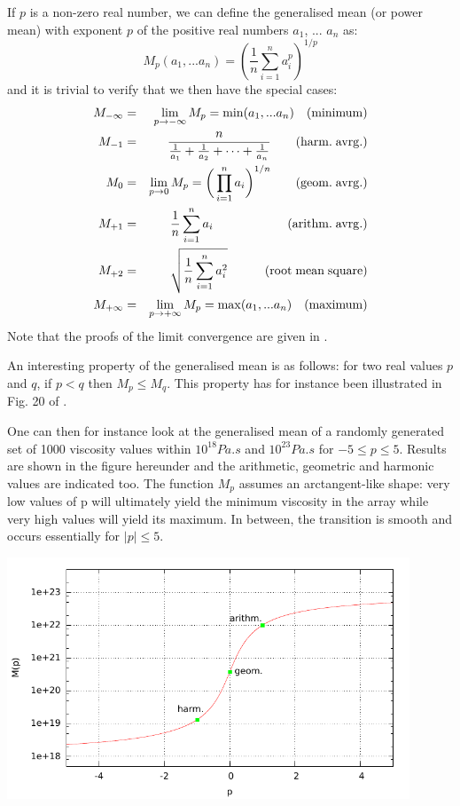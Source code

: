 If $p$ is a non-zero real number, we can define the generalised mean (or power mean)
with exponent $p$ of the positive real numbers $a_1$, ... $a_n$ as:
\begin{equation}
M_p(a_1,...a_n)=
\left(
\frac{1}{n} \sum_{i=1}^n a_i^p
\right)^{1/p}
\end{equation}
and it is trivial to verify that we then have the special cases:
\begin{eqnarray}
M_{-\infty} &=& \lim_{p\rightarrow -\infty} M_p = \min (a_1,...a_n)                   \quad ({\rm minimum})  \\
M_{-1}      &=& \frac{n}{\frac{1}{a_1} + \frac{1}{a_2} + \cdots + \frac{1}{a_n}} \quad\quad  ({\rm harm.\; avrg.}) \\
M_{0}       &=& \lim_{p\rightarrow 0} M_p = \bigg(\prod_{i=1}^n a_i \bigg)^{1/n} \quad\quad  ({\rm geom.\; avrg.}) \\
M_{+1}      &=& \frac{1}{n}\sum_{i=1}^n a_i                                      \quad\quad\quad\quad\quad\quad  ({\rm arithm.\; avrg.}) \\
M_{+2}      &=& \sqrt{ \frac{1}{n} \sum_{i=1}^n a_i^2   }    \quad\quad\quad ({\rm root\;  mean \; square})  \\ 
M_{+\infty} &=& \lim_{p\rightarrow +\infty} M_p = \max (a_1,...a_n)     \quad ({\rm maximum}) 
\end{eqnarray}
Note that the proofs of the limit convergence are given in \cite{bull03}.  

An interesting property of the generalised mean is as follows:
for two real values $p$ and $q$, if $p<q$ then $M_p \leq M_q$.
This property has for instance been illustrated in Fig. 20 of \cite{scbe08}. 

One can then for instance look at the generalised mean of 
a randomly generated set of 1000 viscosity values within $10^{18}Pa.s$
and $10^{23}Pa.s$ for $-5\leq p\leq 5$. Results are shown 
in the figure hereunder and the arithmetic, geometric and 
harmonic values are indicated too. 
The function $M_p$ assumes an arctangent-like shape: very low values of p 
will ultimately yield the minimum viscosity in the array while very high values will 
yield its maximum. In between, the transition is smooth and occurs essentially for $|p|\leq 5$. 

\includegraphics[width=12cm]{images/avrg/avrg.pdf}











